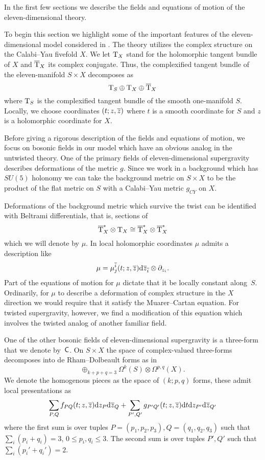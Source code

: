 In the first few sections we describe the fields and equations of motion of the eleven-dimensional theory. 

%

\parsec[s:sugrafields]

To begin this section we highlight some of the important features of the eleven-dimensional model considered in \cite{RSW}. 
The theory utilizes the complex structure on the Calabi--Yau fivefold $X$.
We let ${\rm T}_X$ stand for the holomorphic tangent bundle of $X$ and $\overline{{\rm T}}_X$ its complex conjugate.
Thus, the complexified tangent bundle of the eleven-manifold $S \times X$ decomposes as
\[
{\rm T}_S \oplus {\rm T}_X \oplus \overline{{\rm T}}_X 
\]
where ${\rm T}_S$ is the complexified tangent bundle of the smooth one-manifold $S$.
Locally, we choose coordinates $(t;z,\overline{z})$ where $t$ is a smooth coordinate for $S$ and $z$ is a holomorphic coordinate for $X$. 

Before giving a rigorous description of the fields and equations of motion, we focus on bosonic fields in our model which have an obvious analog in the untwisted theory. 
One of the primary fields of eleven-dimensional supergravity describes deformations of the metric $g$.
Since we work in a background which has $SU(5)$ holonomy we can take the background metric on $S \times X$ to be the product of the flat metric on $S$ with a Calabi--Yau metric $g_{CY}$ on $X$. 

Deformations of the background metric which survive the twist can be identified with Beltrami differentials, that is, sections of 
\[
\overline{{\rm T}}_X^* \otimes {\rm T}_X \cong \overline{{\rm T}}^*_X \otimes \overline{{\rm T}}_X^* 
\]
which we will denote by $\mu$. 
In local holomorphic coordinates $\mu$ admits a description like
\[
\mu = \mu^{\overline{i}}_j (t;z,\overline{z}) {\rm d} \overline{z}_{\overline{i}} \otimes \partial_{z_i} .
\]
Part of the equations of motion for $\mu$ dictate that it be locally constant along~$S$.
Ordinarily, for $\mu$ to describe a deformation of complex structure in the $X$ direction we would require that it satisfy the Muarer--Cartan equation.
For twisted supergravity, however, we find a modification of this equation which involves the twisted analog of another familiar field.

One of the other bosonic fields of eleven-dimensional supergravity is a three-form that we denote by~$\sf C$. 
On $S \times X$ the space of complex-valued three-forms decomposes into de Rham--Dolbeault forms as in
\[
\oplus_{k+p+q=3} \Omega^k(S) \otimes \Omega^{p,q}(X) .
\]
We denote the homogenous pieces as the space of $(k;p,q)$ forms, these admit local presentations as
\[
\sum_{P,Q} f_{PQ} (t;z,\overline{z}) {\rm d} z_P {\rm d} \overline{z}_Q + \sum_{P',Q'} g_{P'Q'}(t;z,\overline{z}) {\rm d} t {\rm d} z_{P'}{\rm d} \overline{z}_{Q'} 
\]
where the first sum is over tuples $P=(p_1,p_2,p_3),Q=(q_1,q_2,q_3)$ such that $\sum_i (p_i + q_i) = 3$, $0 \leq p_i,q_i \leq 3$.
The second sum is over tuples $P',Q'$ such that $\sum_i (p_i'+q_i') = 2$. 

